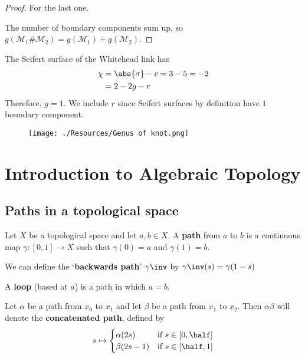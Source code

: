 \documentclass[12pt, a4paper]{article}
\begin{document}
\begin{proof}
    For the last one.

    The number of boundary components sum up, so \( g(\mathcal{M}_1 \# \mathcal{M}_2) = g(\mathcal{M}_1) + g(\mathcal{M}_2) \).
\end{proof}

\begin{mdexample}
    The Seifert surface of the Whitehead link has 
    \[\begin{aligned}
        \chi &= \abs{\sigma}-c =3-5 =-2 \\
        &=2-2g-r
    \end{aligned}\]
    Therefore, \(g=1\). We include \(r\) since Seifert surfaces by definition have \(1\) boundary component.
\end{mdexample}

\begin{figure}[H]
     \begin{center}
         \texttt{[image: ./Resources/Genus of knot.png]}
     \end{center}
\end{figure}

\section{Introduction to Algebraic Topology}

\subsection{Paths in a topological space}

\begin{definition}
    Let \(X\) be a topological space and let \(a,b \in X\). A \textbf{path} from \(a\) to \(b\) is a continuous map \(\gamma :[0,1] \to X\) such that \(\gamma(0)=a\) and \(\gamma(1)=b\). 
\end{definition}

\begin{definition}
    We can define the `\textbf{backwards path}' \(\gamma\inv\) by \(\gamma\inv(s)=\gamma(1-s)\)
\end{definition}

\begin{definition}
    A \textbf{loop} (based at \(a\)) is a path in which \(a=b\).
\end{definition}

\begin{mdthm}
    Let \(\alpha\) be a path from \(x_0\) to \(x_1\) and let \(\beta\) be a path from \(x_1\) to \(x_2\). Then \(\alpha\beta\) will denote the \textbf{concatenated path}, defined by 
    \[s \mapsto \begin{cases}
        \alpha(2s) &\text{if } s\in\left[ 0,\half \right]\\
        \beta(2s-1) &\text{if } s\in\left[ \half,1 \right]
    \end{cases}\]
\end{mdthm}
\end{document}
